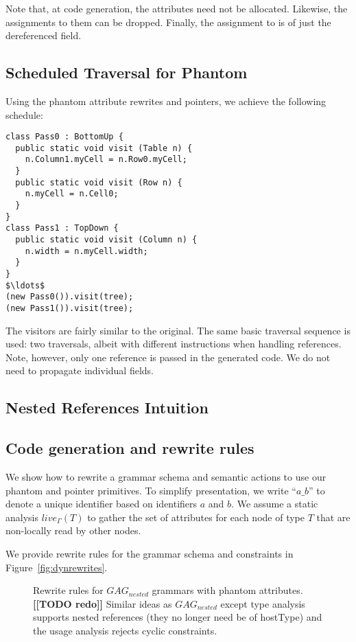 Note that, at code generation, the  attributes need not be allocated. Likewise, the assignments to them can be dropped. Finally, the assignment to  is of just the dereferenced field.

\subsection{Scheduled Traversal for Phantom}

Using the phantom attribute rewrites and pointers, we achieve the following schedule: 


\begin{lstlisting}[mathescape]
class Pass0 : BottomUp {
  public static void visit (Table n) { 
    n.Column1.myCell = n.Row0.myCell;
  }
  public static void visit (Row n) { 
    n.myCell = n.Cell0;
  }
}
class Pass1 : TopDown {
  public static void visit (Column n) { 
    n.width = n.myCell.width; 
  }
}
$\ldots$
(new Pass0()).visit(tree);
(new Pass1()).visit(tree);
\end{lstlisting}

The visitors are fairly similar to the original. The same basic traversal sequence is used: two traversals, albeit with different instructions when handling references. Note, however, only one reference is passed in the generated code. We do not need to propagate individual fields. 

\subsection{Nested References Intuition}
\label{sec:nested}


\subsection{Code generation and rewrite rules}

We show how to rewrite a grammar schema and semantic actions to use our phantom and pointer primitives. To simplify presentation, we write ``$a\_b$'' to denote a unique identifier based on identifiers $a$ and $b$. We assume a static analysis $live_\Gamma(T)$ to gather the set of attributes for each node of type $T$ that are non-locally read by other nodes.


We provide rewrite rules for the grammar schema and constraints in Figure~\ref{fig:dynrewrites}.



%
\begin{figure*}
\caption{Rewrite rules for $GAG_{nested}$ grammars with phantom attributes.\textbf{[[TODO redo]]} Similar ideas as $GAG_{nested}$ except type analysis supports nested references (they no longer need be of hostType) and the usage analysis rejects cyclic constraints. }
\label{fig:nestedrewrites}
\end{figure*}

